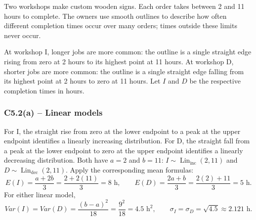 {
Two workshops make custom wooden signs. Each order takes between 2 and
11 hours to complete. The owners use smooth outlines to describe how often
different completion times occur over many orders; times outside these limits
never occur.

At workshop I, longer jobs are more common: the outline is a single straight
edge rising from zero at 2 hours to its highest point at 11 hours.
At workshop D, shorter jobs are more common: the outline is a single straight
edge falling from its highest point at 2 hours to zero at 11 hours.
Let $I$ and $D$ be the respective completion times in hours.
\label{sol:c5-2a}
\subsubsection*{C5.2(a) -- Linear models }
For I, the straight rise from zero at the lower endpoint to a peak at the
upper endpoint identifies a linearly increasing distribution. For D, the
straight fall from a peak at the lower endpoint to zero at the upper endpoint
identifies a linearly decreasing distribution. Both have $a=2$ and $b=11$:
$I\sim\operatorname{Lin}_{\mathrm{inc}}(2,11)$ and
$D\sim\operatorname{Lin}_{\mathrm{dec}}(2,11)$. Apply the corresponding mean formulas:
\[
E(I)=\frac{a+2b}{3}=\frac{2+2(11)}{3}=8\text{ h},\qquad
E(D)=\frac{2a+b}{3}=\frac{2(2)+11}{3}=5\text{ h}.
\]
For either linear model,
\[
Var(I)=Var(D)=\frac{(b-a)^2}{18}=\frac{9^2}{18}=4.5\text{ h}^2,
\qquad \sigma_I=\sigma_D=\sqrt{4.5}\approx2.121\text{ h}.
\]

}
